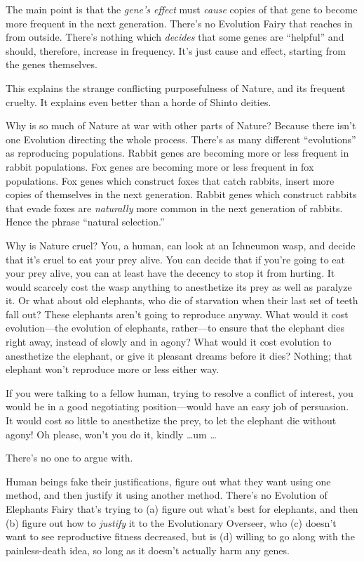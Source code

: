 {
 The main point is that the \textit{gene's effect}
must \textit{cause} copies of that gene to become more frequent in the
next generation. There's no Evolution Fairy that
reaches in from outside. There's nothing which
\textit{decides} that some genes are
``helpful'' and should, therefore,
increase in frequency. It's just cause and effect,
starting from the genes themselves.}

{
 This explains the strange conflicting purposefulness of Nature,
and its frequent cruelty. It explains even better than a horde of
Shinto deities.}

{
 Why is so much of Nature at war with other parts of Nature?
Because there isn't one Evolution directing the whole
process. There's as many different
``evolutions'' as reproducing
populations. Rabbit genes are becoming more or less frequent in rabbit
populations. Fox genes are becoming more or less frequent in fox
populations. Fox genes which construct foxes that catch rabbits, insert
more copies of themselves in the next generation. Rabbit genes which
construct rabbits that evade foxes are \textit{naturally} more common
in the next generation of rabbits. Hence the phrase
``natural selection.''}

{
 Why is Nature cruel? You, a human, can look at an Ichneumon wasp,
and decide that it's cruel to eat your prey alive. You
can decide that if you're going to eat your prey alive,
you can at least have the decency to stop it from hurting. It would
scarcely cost the wasp anything to anesthetize its prey as well as
paralyze it. Or what about old elephants, who die of starvation when
their last set of teeth fall out? These elephants
aren't going to reproduce anyway. What would it cost
evolution---the evolution of elephants, rather---to ensure that the
elephant dies right away, instead of slowly and in agony? What would it
cost evolution to anesthetize the elephant, or give it pleasant dreams
before it dies? Nothing; that elephant won't reproduce
more or less either way.}

{
 If you were talking to a fellow human, trying to resolve a
conflict of interest, you would be in a good negotiating
position---would have an easy job of persuasion. It would cost so
little to anesthetize the prey, to let the elephant die without agony!
Oh please, won't you do it, kindly \ldots um \ldots}

{
 There's no one to argue with.}

{
 Human beings fake their justifications, figure out what they want
using one method, and then justify it using another method.
There's no Evolution of Elephants Fairy
that's trying to (a) figure out what's
best for elephants, and then (b) figure out how to \textit{justify} it
to the Evolutionary Overseer, who (c) doesn't want to
see reproductive fitness decreased, but is (d) willing to go along with
the painless-death idea, so long as it doesn't actually
harm any genes.}

